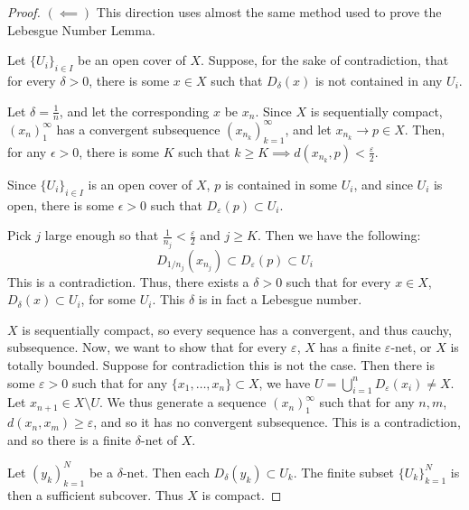 \documentclass[openany, amssymb, psamsfonts]{amsart}
\theoremstyle{definition}
\numberwithin{equation}{section}
\begin{document}
\begin{proof}[Proof]
  $(\impliedby)$ This direction uses almost the same method used to prove the Lebesgue Number Lemma. 

  Let $\{U_i\}_{i\in I}$ be an open cover of $X$. Suppose, for the sake of contradiction, that for every $\delta > 0$, there is some $x \in X$ such that $D_\delta(x)$ is not contained in any $U_i$. 

  Let $\delta = \frac{1}{n}$, and let the corresponding $x$ be $x_n$. Since $X$ is sequentially compact, $(x_n)_1^\infty$ has a convergent subsequence $(x_{n_k})_{k=1}^\infty$, and let $x_{n_k}\to p \in X$. Then, for any $\epsilon > 0$, there is some $K$ such that $k \ge K \implies d(x_{n_k}, p) < \frac{\varepsilon}{2}$. 

  Since $\{U_i\}_{i\in I}$ is an open cover of $X$, $p$ is contained in some $U_i$, and since $U_i$ is open, there is some $\epsilon > 0$ such that $D_{\varepsilon}(p) \subset U_i$. 

  Pick $j$ large enough so that $\frac{1}{n_j} < \frac{\varepsilon}{2}$ and $j \ge K$. Then we have the following:
  \begin{equation*}
    D_{1/n_j}(x_{n_j}) \subset D_\varepsilon(p) \subset U_i
  \end{equation*}
  This is a contradiction. Thus, there exists a $\delta > 0$ such that for every $x\in X$, $D_\delta(x) \subset U_i$, for some $U_i$. This $\delta$ is in fact a Lebesgue number. 

  $X$ is sequentially compact, so every sequence has a convergent, and thus cauchy, subsequence. Now, we want to show that for every $\varepsilon$, $X$ has a finite $\varepsilon$-net, or $X$ is totally bounded. Suppose for contradiction this is not the case. Then there is some $\varepsilon > 0$ such that for any $\{x_1, \ldots, x_n\} \subset X$, we have $U = \bigcup_{i = 1}^n D_\varepsilon(x_i) \neq X$. Let $x_{n+1} \in X \setminus U$. We thus generate a sequence $(x_n)_1^\infty$ such that for any $n,m$, $d(x_n,x_m) \ge \varepsilon$, and so it has no convergent subsequence. This is a contradiction, and so there is a finite $\delta$-net of $X$. 

Let $(y_k)_{k=1}^N$ be a $\delta$-net. Then each $D_\delta(y_k) \subset U_k$. The finite subset $\{U_k\}_{k=1}^N$ is then a sufficient subcover. Thus $X$ is compact.
\end{proof}
\end{document}
